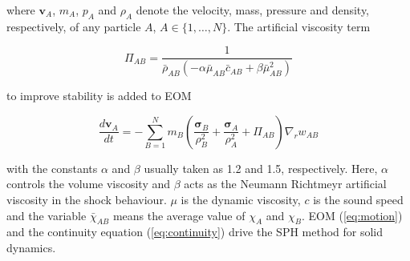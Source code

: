 \documentclass{svproc}
\newcommand{\reva}[1]{{\color{black}#1}}
\begin{document}

\noindent
where ${\bm v}_A$, $m_A$, $p_A$ and $\rho_A$ denote the velocity, mass, pressure and density, respectively, of any particle \reva{$A$, $A\in\{1,\dots,N\}$}. The artificial viscosity term

\begin{equation}
\label{eq:viscosity}
\Pi_{AB}=\frac{1}{\bar\rho_{AB}\left(-\alpha\bar\mu_{AB}\bar c_{AB}+\beta\bar\mu_{AB}^2\right)}%
\end{equation}

\noindent
to improve stability is added to EOM~\cite{Taddei:2015}

\begin{equation}
\label{eq:motion}
\frac{d{\bm v}_A}{dt}=-\sum\limits_{B=1}^{N}m_B\left(\frac{\bm\sigma_B}{\rho_B^2}+\frac{\bm\sigma_A}{\rho_A^2}+\Pi_{AB}\right)\nabla_r w_{AB}
\end{equation}

\noindent
with the constants $\alpha$ and $\beta$ usually taken as 1.2 and 1.5, respectively. 
\reva{Here, $\alpha$ controls the volume viscosity and $\beta$ acts as the Neumann Richtmeyr artificial viscosity in the shock behaviour.} $\mu$ is the dynamic viscosity, $c$ is the sound speed and the variable \reva{$\bar\chi_{AB}$ means the average value of $\chi_A$ and $\chi_B$}. EOM (\ref{eq:motion}) and the continuity equation (\ref{eq:continuity}) drive the SPH method for solid dynamics.
%
%
%
%
%
%
%
\end{document}
